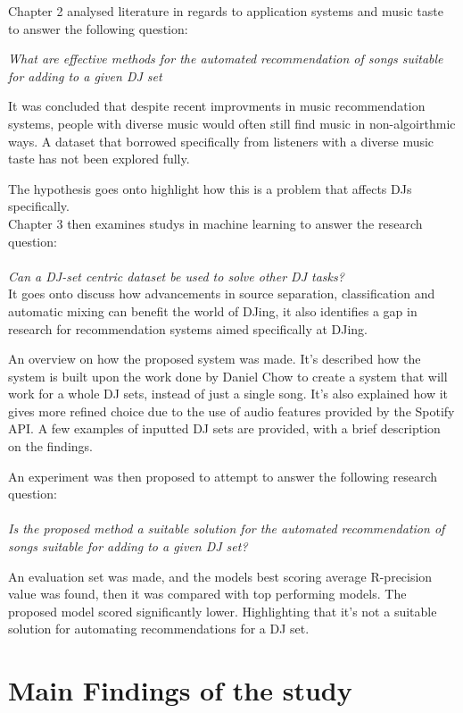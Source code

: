 Chapter 2 analysed literature in regards to application systems and music taste to answer the following question: 

\textit{What are effective methods for the automated recommendation of songs suitable
	for adding to a given DJ set}

It was concluded that despite recent improvments in music recommendation systems, people with diverse music would often still find music in non-algoirthmic ways. A dataset that borrowed specifically from listeners with a diverse music taste has not been explored fully.

The hypothesis goes onto highlight how this  is a problem that affects DJs specifically.
\\

Chapter 3 then examines studys in machine learning to answer the research question:
\\
\\
\textit{Can a DJ-set centric dataset be used to solve other DJ tasks?}
\\
It goes onto discuss how advancements in source separation, classification and automatic mixing can benefit the world of DJing, it also identifies a gap in research for recommendation systems aimed specifically at DJing.

An overview on how the proposed system was made. It's described how the system is built upon the work done by Daniel Chow to create a system that will work for a whole DJ sets, instead of just a single song. It's also explained how it gives more refined choice due to the use of audio features provided by the Spotify API. A few examples of inputted DJ sets are provided, with a brief description on the findings. 

An experiment was then proposed to attempt to answer the following research question:
\\
\\
\textit{Is the proposed method a suitable solution for the automated recommendation of songs suitable for adding to a given DJ set?}

An evaluation set was made, and the models best scoring average R-precision value was found, then it was compared with top performing models. The proposed model scored significantly lower. Highlighting that it's not a suitable solution for automating recommendations for a DJ set.

\section{Main Findings of the study}

